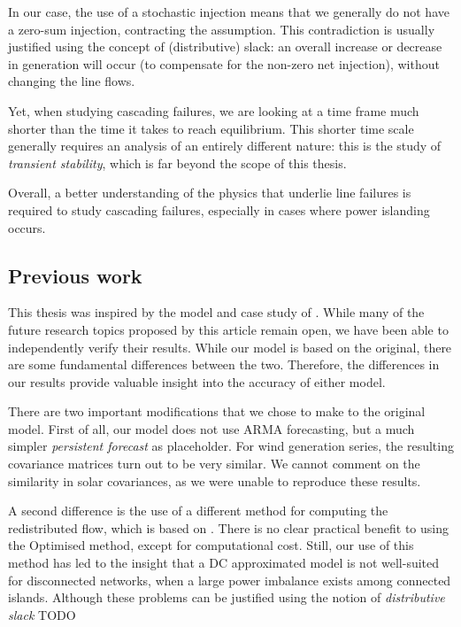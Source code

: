 \documentclass[main.tex]{subfiles}
\begin{document}
In our case, the use of a stochastic injection means that we generally do not have a zero-sum injection, contracting the assumption. This contradiction is usually justified using the concept of (distributive) slack: an overall increase or decrease in generation will occur (to compensate for the non-zero net injection), without changing the line flows.

Yet, when studying cascading failures, we are looking at a time frame much shorter than the time it takes to reach equilibrium. 
This shorter time scale generally requires an analysis of an entirely different nature: this is the study of \emph{transient stability}, which is far beyond the scope of this thesis. 

Overall, a better understanding of the physics that underlie line failures is required to study cascading failures, especially in cases where power islanding occurs. 

\subsection{Previous work \citep{Nesti2018emergentfailures}}\label{sec:discussionnesti}
This thesis was inspired by the model and case study of \cite{Nesti2018emergentfailures}. While many of the future research topics proposed by this article remain open, we have been able to independently verify their results. While our model is based on the original, there are some fundamental differences between the two. Therefore, the differences in our results provide valuable insight into the accuracy of either model. 

There are two important modifications that we chose to make to the original model. First of all, our model does not use ARMA forecasting, but a much simpler \emph{persistent forecast} as placeholder. For wind generation series, the resulting covariance matrices turn out to be very similar. We cannot comment on the similarity in solar covariances, as we were unable to reproduce these results.

A second difference is the use of a different method for computing the redistributed flow, which is based on \cite{Ronellenfitsch2017}. There is no clear practical benefit to using the Optimised method, except for computational cost. Still, our use of this method has led to the insight that a DC approximated model is not well-suited for disconnected networks, when a large power imbalance exists among connected islands. Although these problems can be justified using the notion of \emph{distributive slack} TODO
\end{document}
